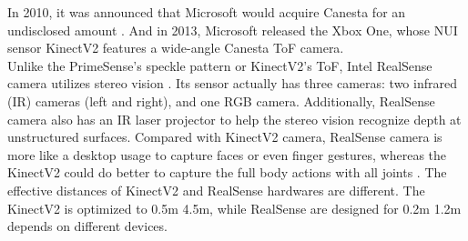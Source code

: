 In 2010, it was announced that Microsoft would acquire Canesta for an undisclosed amount \cite{Canesta_2010}. %
And in 2013,  Microsoft released the Xbox One, whose \gls{NUI} sensor \gls{KinectV2} features a wide-angle Canesta \gls{ToF} camera.
\\\indent
Unlike the PrimeSense's speckle pattern or \gls{KinectV2}'s \gls{ToF}, Intel RealSense camera utilizes stereo vision \cite{RealSense01_2015}. Its sensor actually has three cameras: two infrared (\gls{IR}) cameras (left and right), and one RGB camera. Additionally, RealSense camera also has an \gls{IR} laser projector to help the stereo vision recognize depth at unstructured surfaces. Compared with \gls{KinectV2} camera, RealSense camera is more like a desktop usage to capture faces or even finger gestures, whereas the \gls{KinectV2} could do better to capture the full body actions with all joints \cite{RealSense02_2016}. The effective distances of \gls{KinectV2} and RealSense hardwares are different. The \gls{KinectV2} is optimized to 0.5m \texttildelow 4.5m, while RealSense are designed for 0.2m \texttildelow 1.2m depends on different devices.

